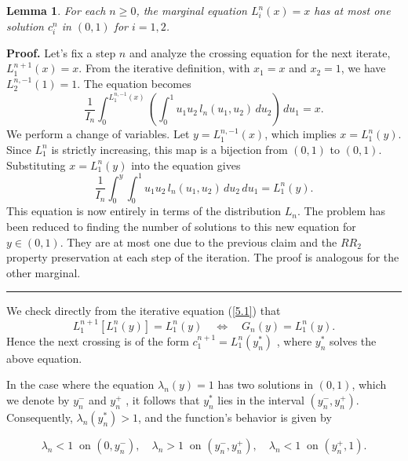 \documentclass[onecolumn]{article}
\newtheorem{lemma}[theorem]{Lemma}
\newenvironment{proof}[1][Proof]{\noindent\textbf{#1.} }{\ \rule{0.5em}{0.5em}}
\begin{document}
\begin{lemma}
\label{one-sol} For each $n\geq 0$, the marginal equation $L_{i}^{n}(x)=x$
has at most one solution $c_{i}^{n}$ in $(0,1)$ for $i=1,2$.
\end{lemma}

\begin{proof}
\vspace{0pt} \noindent Let's fix a step $n$ and analyze the crossing
equation for the next iterate, $L_{1}^{n+1}(x)=x$. From the iterative
definition, with $x_{1}=x$ and $x_{2}=1$, we have $L_{2}^{n,-1}(1)=1$. The
equation becomes 
\begin{equation}
\frac{1}{I_{n}}\int_{0}^{L_{1}^{n,-1}(x)}\left(
\int_{0}^{1}u_{1}u_{2}\,l_{n}(u_{1},u_{2})\,du_{2}\right) \,du_{1}=x.
\label{342}
\end{equation}%
We perform a change of variables. Let $y=L_{1}^{n,-1}(x)$, which implies $%
x=L_{1}^{n}(y)$. Since $L_{1}^{n}$ is strictly increasing, this map is a
bijection from $(0,1)$ to $(0,1)$. Substituting $x=L_{1}^{n}(y)$ into the
equation gives 
\begin{equation}
\frac{1}{I_{n}}\int_{0}^{y}\int_{0}^{1}u_{1}u_{2}\,l_{n}(u_{1},u_{2})%
\,du_{2}\,du_{1}=L_{1}^{n}(y).  \label{343}
\end{equation}%
This equation is now entirely in terms of the distribution $L_{n}$. The
problem has been reduced to finding the number of solutions to this new
equation for $y\in (0,1)$. They are at most one due to the previous claim
and the $RR_{2}$ property preservation at each step of the iteration. The
proof is analogous for the other marginal.
\end{proof}

We check directly from the iterative equation (\ref{5.1}) that 
\begin{equation}
L_{1}^{n+1}[L_{1}^{n}(y)]=L_{1}^{n}(y)\quad \Longleftrightarrow \quad
G_{n}(y)=L_{1}^{n}(y).  \label{345}
\end{equation}%
Hence the next crossing is of the form $c_{1}^{n+1}=L_{1}^{n}(y_{n}^{\ast })$%
, where $y_{n}^{\ast }$ solves the above equation.

In the case where the equation $\lambda _{n}(y)=1$ has two solutions in $%
(0,1)$, which we denote by $y_{n}^{-}$ and $y_{n}^{+}$ , it follows that $%
y_{n}^{\ast }$ lies in the interval $(y_{n}^{-},y_{n}^{+})$. Consequently, $%
\lambda _{n}(y_{n}^{\ast })>1$, and the function's behavior is given by

\begin{equation}
\lambda _{n}<1\ \text{ on }(0,y_{n}^{-}),\quad \lambda _{n}>1\ \text{ on }%
(y_{n}^{-},y_{n}^{+}),\quad \lambda _{n}<1\ \text{ on }(y_{n}^{+},1).
\label{345a}
\end{equation}
\end{document}
